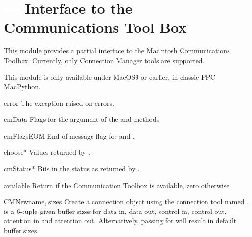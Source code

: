 \section{ ---
         Interface to the Communications Tool Box}



This module provides a partial interface to the Macintosh
Communications Toolbox. Currently, only Connection Manager tools are
supported.

This module is only available under MacOS9 or earlier, in classic PPC
MacPython.

\begin{datadesc}{error}
The exception raised on errors.
\end{datadesc}

\begin{datadesc}{cmData}
Flags for the  argument of the  and
 methods.
\end{datadesc}

\begin{datadesc}{cmFlagsEOM}
End-of-message flag for  and .
\end{datadesc}

\begin{datadesc}{choose*}
Values returned by .
\end{datadesc}

\begin{datadesc}{cmStatus*}
Bits in the status as returned by .
\end{datadesc}

\begin{funcdesc}{available}{}
Return  if the Communication Toolbox is available, zero otherwise.
\end{funcdesc}

\begin{funcdesc}{CMNew}{name, sizes}
Create a connection object using the connection tool named
.  is a 6-tuple given buffer sizes for data in,
data out, control in, control out, attention in and attention out.
Alternatively, passing  for  will result in
default buffer sizes.
\end{funcdesc}


